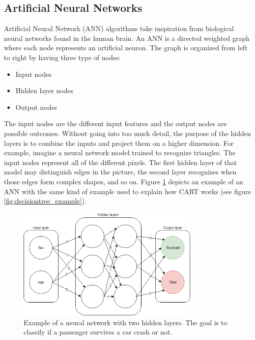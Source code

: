 	\subsection{Artificial Neural Networks} \label{sec:deep_learning}
			Artificial Neural Network (ANN) algorithms take inspiration from biological neural networks found in the human brain. An ANN is a directed weighted graph where each node represents an artificial neuron. The graph is organized from left to right by having three type of nodes:
	\begin{itemize}
		\item Input nodes
		\item Hidden layer nodes
		\item Output nodes
	\end{itemize}
			The input nodes are the different input features and the output nodes are possible outcomes. Without going into too much detail, the purpose of the hidden layers is to combine the inputs and project them on a higher dimension. For example, imagine a neural network model trained to recognize triangles. The input nodes represent all of the different pixels. The first hidden layer of that model may distinguish edges in the picture, the second layer recognizes when those edges form complex shapes, and so on. Figure \ref{fig:neuralnetwork_example} depicts an example of an ANN with the same kind of example used to explain how CART works (see figure  \ref{fig:decisiontree_example}).

\begin{figure}[H] 
	\centering
	\includegraphics[width=0.8\textwidth]{media/neuralnetwork_ex.png}
	\caption{Example of a neural network with two hidden layers. The goal is to classify if a passenger survives a car crash or not.}
	\label{fig:neuralnetwork_example}
\end{figure}

